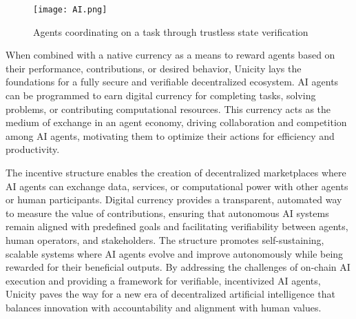 \documentclass{article}
\begin{document}
\begin{figure}[H]
    \centering
    \texttt{[image: AI.png]}
    \caption{Agents coordinating on a task through trustless state verification }
    \label{fig:ai}
\end{figure}



When combined with a native currency as a means to reward agents based on their performance, contributions, or desired behavior, Unicity lays the foundations for a fully secure and verifiable decentralized ecosystem. AI agents can be programmed to earn digital currency for completing tasks, solving problems, or contributing computational resources. This currency acts as the medium of exchange in an agent economy, driving collaboration and competition among AI agents, motivating them to optimize their actions for efficiency and productivity.


The incentive structure  enables the creation of decentralized marketplaces where AI agents can exchange data, services, or computational power with other agents or human participants. Digital currency provides a transparent, automated way to measure the value of contributions, ensuring that autonomous AI systems remain aligned with predefined goals and facilitating verifiability between agents, human operators, and stakeholders. The structure promotes self-sustaining, scalable systems where AI agents evolve and improve autonomously while being rewarded for their beneficial outputs. By addressing the challenges of on-chain AI execution and providing a framework for verifiable, incentivized AI agents, Unicity paves the way for a new era of decentralized artificial intelligence that balances innovation with accountability and alignment with human values.
\end{document}
